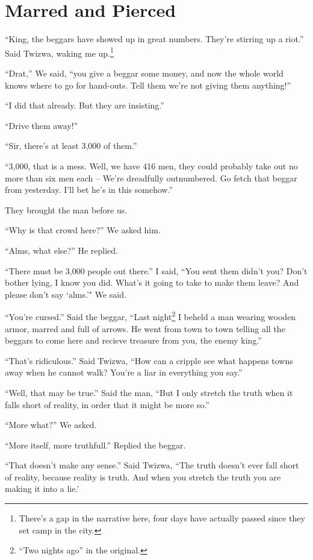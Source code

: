 \chapter {Marred and Pierced}

``King, the beggars have showed up in great numbers. They're stirring up a riot.'' Said Twi\-zwa, waking me up.\footnote{There's a gap in the narrative here, four days have actually passed since they set camp in the city.}

``Drat,'' We said, ``you give a beggar some money, and now the whole world knows where to go for hand-outs. Tell them we're not giving them anything!''

``I did that already. But they are insisting.''

``Drive them away!''

``Sir, there's at least 3,000 of them.''

 ``3,000, that is a mess. Well, we have 416 men, they could probably take out no more than six men each -- We're dreadfully outnumbered. Go fetch that beggar from yesterday. I'll bet he's in this somehow.''

They brought the man before us.

``Why is that crowd here?'' We asked him.

``Alms, what else?'' He replied.

``There must be 3,000 people out there.'' I said, ``You sent them didn't you? Don't bother lying, I know you did. What's it going to take to make them leave? And please don't say `alms.'" We said.

``You're cursed.'' Said the beggar, ``Last night\footnote{``Two nights ago'' in the original.} I beheld a man wearing wooden armor, marred and full of arrows. He went from town to town telling all the beggars to come here and recieve treasure from you, the enemy king.''

``That's ridiculous.'' Said Twi\-zwa, ``How can a cripple see what happens towns away when he cannot walk? You're a liar in everything you say.''

``Well, that may be true.'' Said the man, ``But I only stretch the truth when it falls short of reality, in order that it might be more so.''

``More what?'' We asked.

``More itself, more truthfull.'' Replied the beggar.

``That doesn't make any sense.'' Said Twi\-zwa, ``The truth doesn't ever fall short of reality, because reality is truth. And when you stretch the truth you are making it into a lie.'

